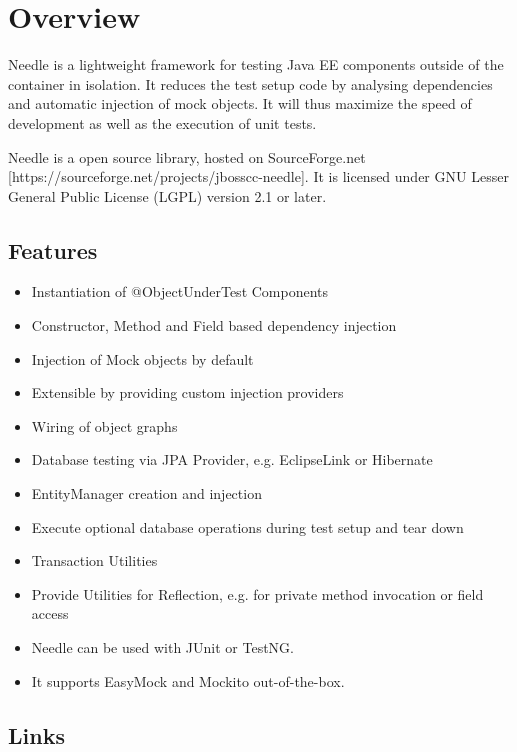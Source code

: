 \chapter{Overview}

Needle is a lightweight framework for testing Java EE components outside of the
container in isolation. It reduces the test setup code by analysing dependencies and
automatic injection of mock objects. It will thus maximize the speed of development as well as the execution of unit tests. 

\parindent 0pt
Needle is a open source library, hosted on SourceForge.net [https://sourceforge.net/projects/jbosscc-needle]. 
It is licensed under GNU Lesser General Public License (LGPL) version 2.1 or later.
	
\section{Features}
\begin{itemize}
	\item Instantiation of @ObjectUnderTest Components
	\item Constructor, Method and Field based dependency injection
	\item Injection of Mock objects by default
	\item Extensible by providing custom injection providers
	\item Wiring of object graphs

	\item Database testing via JPA Provider, e.g. EclipseLink or Hibernate
	\item EntityManager creation and injection
	\item Execute optional database operations during test setup and tear down
	\item Transaction Utilities

	\item Provide Utilities for Reflection, e.g. for private method invocation or field access

	\item Needle can be used with JUnit or TestNG.
	\item It supports EasyMock and Mockito out-of-the-box.
\end{itemize}

\section{Links}

